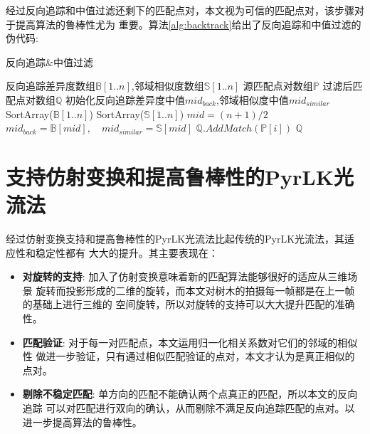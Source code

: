 经过反向追踪和中值过滤还剩下的匹配点对，本文视为可信的匹配点对，该步骤对于提高算法的鲁棒性尤为
重要。算法\ref{alg:backtrack}给出了反向追踪和中值过滤的伪代码:\\
\begin{algorithm}[H]
	\caption{反向追踪\&中值过滤}
	\label{alg:backtrack}
	\begin{algorithmic}[1]
	\Require 反向追踪差异度数组$\mathbb{B}[1..n]$,邻域相似度数组$\mathbb{S}[1..n]$
	\Require 源匹配点对数组$\mathbb{P}$
	\Ensure 过滤后匹配点对数组$\mathbb{Q}$
	\State 初始化反向追踪差异度中值$mid_{back}$,邻域相似度中值$mid_{similar}$
	\State SortArray($\mathbb{B}[1..n]$)
	\State SortArray($\mathbb{S}[1..n]$)
	\State $mid=(n+1)/2$
	\State $mid_{back}=\mathbb{B}[mid],\quad mid_{similar}=\mathbb{S}[mid]$
		\State $\mathbb{Q}.AddMatch(\mathbb{P}[i])$
	\EndIf
	\EndFor
	\State \Return $\mathbb{Q}$
	\end{algorithmic}
\end{algorithm}

\section{支持仿射变换和提高鲁棒性的PyrLK光流法}
经过仿射变换支持和提高鲁棒性的PyrLK光流法比起传统的PyrLK光流法，其适应性和稳定性都有
大大的提升。其主要表现在：\\
\begin{itemize}
	\item \textbf{对旋转的支持}: 加入了仿射变换意味着新的匹配算法能够很好的适应从三维场景
		旋转而投影形成的二维的旋转，而本文对树木的拍摄每一帧都是在上一帧的基础上进行三维的
		空间旋转，所以对旋转的支持可以大大提升匹配的准确性。
	\item \textbf{匹配验证}: 对于每一对匹配点，本文运用归一化相关系数对它们的邻域的相似性
		做进一步验证，只有通过相似匹配验证的点对，本文才认为是真正相似的点对。
	\item \textbf{剔除不稳定匹配}: 单方向的匹配不能确认两个点真正的匹配，所以本文的反向追踪
		可以对匹配进行双向的确认，从而剔除不满足反向追踪匹配的点对。以进一步提高算法的鲁棒性。
\end{itemize}


